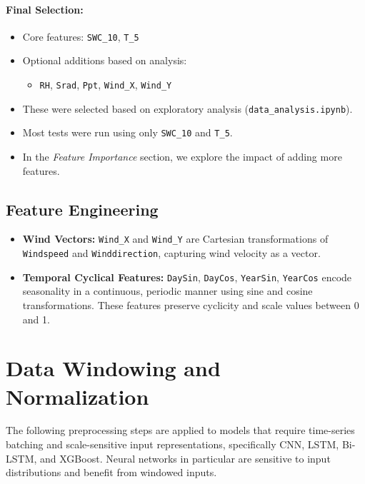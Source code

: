 \documentclass{article}
\begin{document}
\paragraph{Final Selection:}
\begin{itemize}
    \item Core features: \texttt{SWC\_10}, \texttt{T\_5}
    \item Optional additions based on analysis:
    \begin{itemize}
        \item \texttt{RH}, \texttt{Srad}, \texttt{Ppt}, \texttt{Wind\_X}, \texttt{Wind\_Y}
    \end{itemize}
    \item These were selected based on exploratory analysis (\texttt{data\_analysis.ipynb}).
    \item Most tests were run using only \texttt{SWC\_10} and \texttt{T\_5}.
    \item In the \textit{Feature Importance} section, we explore the impact of adding more features.
\end{itemize}

\subsection{Feature Engineering}

\begin{itemize}
    \item \textbf{Wind Vectors:} \texttt{Wind\_X} and \texttt{Wind\_Y} are Cartesian transformations of \texttt{Windspeed} and \texttt{Winddirection}, capturing wind velocity as a vector.
    \item \textbf{Temporal Cyclical Features:} \texttt{DaySin}, \texttt{DayCos}, \texttt{YearSin}, \texttt{YearCos} encode seasonality in a continuous, periodic manner using sine and cosine transformations. These features preserve cyclicity and scale values between 0 and 1.
\end{itemize}


\section{Data Windowing and Normalization}

The following preprocessing steps are applied to models that require time-series batching and scale-sensitive input representations, specifically CNN, LSTM, Bi-LSTM, and XGBoost. Neural networks in particular are sensitive to input distributions and benefit from windowed inputs.
\end{document}

